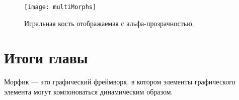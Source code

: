 \documentclass[a4paper,10pt,twoside]{book}
\begin{document}
\begin{figure}[ht]
	\centerline{\texttt{[image: multiMorphs]}}
	\caption{Игральная кость отображаемая с альфа-прозрачностью.
		}
\end{figure}





\section{Итоги главы}

Морфик --- это графический фреймворк, в котором элементы графического элемента могут компоноваться динамическим образом.
\end{document}
